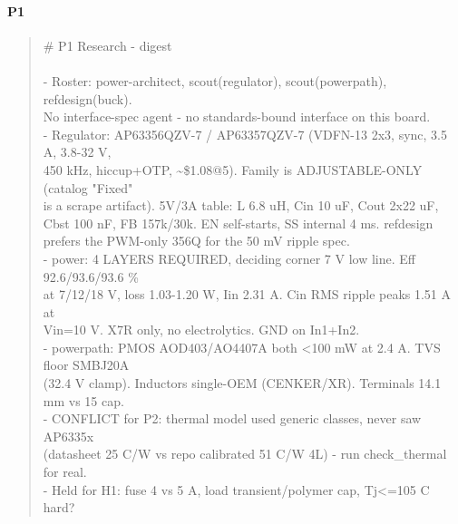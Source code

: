 \documentclass[11pt,a4paper]{article}
\begin{document}
\paragraph*{P1}
\begin{quote}\small\ttfamily\raggedright
\# P1 Research - digest\\
~\\
- Roster: power-architect, scout(regulator), scout(powerpath), refdesign(buck).\\
  No interface-spec agent - no standards-bound interface on this board.\\
- Regulator: AP63356QZV-7 / AP63357QZV-7 (VDFN-13 2x3, sync, 3.5 A, 3.8-32 V,\\
  450 kHz, hiccup+OTP, \textasciitilde{}\$1.08@5). Family is ADJUSTABLE-ONLY (catalog "Fixed"\\
  is a scrape artifact). 5V/3A table: L 6.8 uH, Cin 10 uF, Cout 2x22 uF,\\
  Cbst 100 nF, FB 157k/30k. EN self-starts, SS internal 4 ms. refdesign\\
  prefers the PWM-only 356Q for the 50 mV ripple spec.\\
- power: 4 LAYERS REQUIRED, deciding corner 7 V low line. Eff 92.6/93.6/93.6 \%\\
  at 7/12/18 V, loss 1.03-1.20 W, Iin 2.31 A. Cin RMS ripple peaks 1.51 A at\\
  Vin=10 V. X7R only, no electrolytics. GND on In1+In2.\\
- powerpath: PMOS AOD403/AO4407A both \textless{}100 mW at 2.4 A. TVS floor SMBJ20A\\
  (32.4 V clamp). Inductors single-OEM (CENKER/XR). Terminals 14.1 mm vs 15 cap.\\
- CONFLICT for P2: thermal model used generic classes, never saw AP6335x\\
  (datasheet 25 C/W vs repo calibrated 51 C/W 4L) - run check\_thermal for real.\\
- Held for H1: fuse 4 vs 5 A, load transient/polymer cap, Tj\textless{}=105 C hard?
\end{quote}
\end{document}
